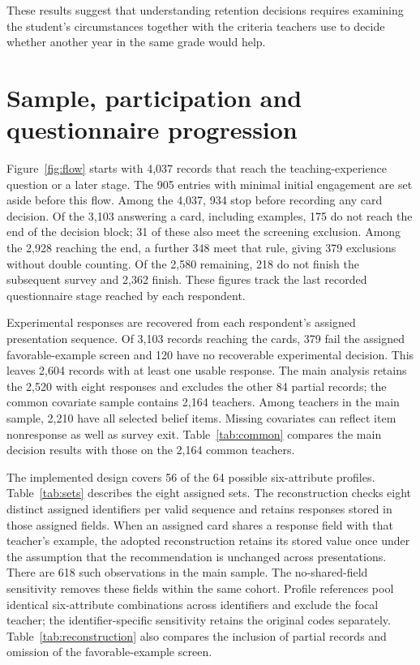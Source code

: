 These results suggest that understanding retention decisions requires examining the student's circumstances together with the criteria teachers use to decide whether another year in the same grade would help.

\clearpage\color{black}
\clearpage\appendix{}\color{reused}
\color{reused}
\section{Sample, participation and questionnaire progression}\label{app:sample}
Figure~\ref{fig:flow} starts with 4,037 records that reach the teaching-experience question or a later stage. The 905 entries with minimal initial engagement are set aside before this flow. Among the 4,037, 934 stop before recording any card decision. Of the 3,103 answering a card, including examples, 175 do not reach the end of the decision block; 31 of these also meet the screening exclusion. Among the 2,928 reaching the end, a further 348 meet that rule, giving 379 exclusions without double counting. Of the 2,580 remaining, 218 do not finish the subsequent survey and 2,362 finish. These figures track the last recorded questionnaire stage reached by each respondent.

Experimental responses are recovered from each respondent's assigned presentation sequence. Of 3,103 records reaching the cards, 379 fail the assigned favorable-example screen and 120 have no recoverable experimental decision. This leaves 2,604 records with at least one usable response. The main analysis retains the 2,520 with eight responses and excludes the other 84 partial records; the common covariate sample contains 2,164 teachers. Among teachers in the main sample, 2,210 have all selected belief items. Missing covariates can reflect item nonresponse as well as survey exit. Table~\ref{tab:common} compares the main decision results with those on the 2,164 common teachers.

The implemented design covers 56 of the 64 possible six-attribute profiles. Table~\ref{tab:sets} describes the eight assigned sets. The reconstruction checks eight distinct assigned identifiers per valid sequence and retains responses stored in those assigned fields. When an assigned card shares a response field with that teacher's example, the adopted reconstruction retains its stored value once under the assumption that the recommendation is unchanged across presentations. There are 618 such observations in the main sample. The no-shared-field sensitivity removes these fields within the same cohort. Profile references pool identical six-attribute combinations across identifiers and exclude the focal teacher; the identifier-specific sensitivity retains the original codes separately. Table~\ref{tab:reconstruction} also compares the inclusion of partial records and omission of the favorable-example screen.


